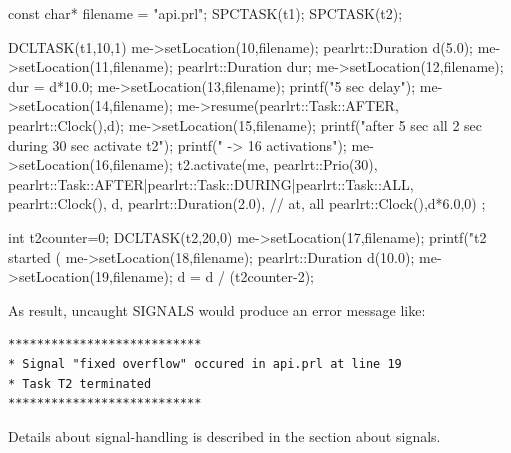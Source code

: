 \begin{CppCode}
const char* filename =  "api.prl";
SPCTASK(t1);
SPCTASK(t2);

DCLTASK(t1,10,1) {
   me->setLocation(10,filename);
   pearlrt::Duration d(5.0);
   me->setLocation(11,filename);
   pearlrt::Duration dur;
   me->setLocation(12,filename);
   dur = d*10.0;
   me->setLocation(13,filename);
   printf("5 sec delay\n");
   me->setLocation(14,filename);
   me->resume(pearlrt::Task::AFTER, pearlrt::Clock(),d);
   me->setLocation(15,filename);    
   printf("after 5 sec all 2 sec during 30 sec activate  t2\n");
   printf("    -> 16 activations\n");
   me->setLocation(16,filename);
   t2.activate(me, pearlrt::Prio(30),
               pearlrt::Task::AFTER|pearlrt::Task::DURING|pearlrt::Task::ALL,
               pearlrt::Clock(), d, pearlrt::Duration(2.0), // at, all
               pearlrt::Clock(),d*6.0,0) ;    
}

int t2counter=0;
DCLTASK(t2,20,0) {
   me->setLocation(17,filename);
   printf("t2 started (%
   me->setLocation(18,filename);
   pearlrt::Duration d(10.0);
   me->setLocation(19,filename);
   d = d / (t2counter-2);
}
\end{CppCode}

As result, uncaught SIGNALS would produce an error message like:
\begin{verbatim}
***************************
* Signal "fixed overflow" occured in api.prl at line 19
* Task T2 terminated
***************************
\end{verbatim}

Details about signal-handling is described in the section about signals.

